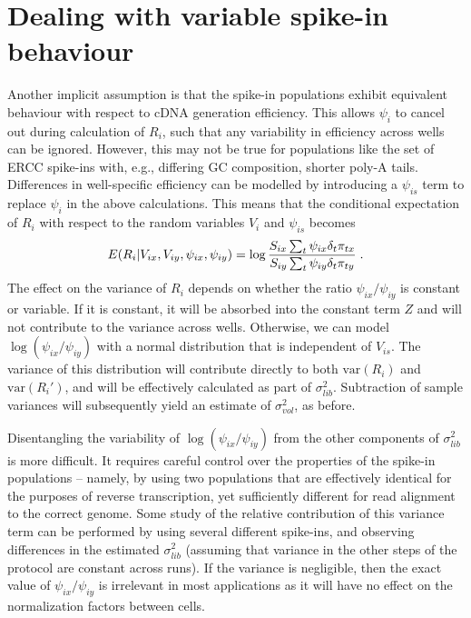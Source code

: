 \documentclass{article}
\begin{document}
\newpage
\section{Dealing with variable spike-in behaviour}
Another implicit assumption is that the spike-in populations exhibit equivalent behaviour with respect to cDNA generation efficiency.
This allows $\psi_i$ to cancel out during calculation of $R_i$, such that any variability in efficiency across wells can be ignored.
However, this may not be true for populations like the set of ERCC spike-ins with, e.g., differing GC composition, shorter poly-A tails.
Differences in well-specific efficiency can be modelled by introducing a $\psi_{is}$ term to replace $\psi_i$ in the above calculations.
This means that the conditional expectation of $R_i$ with respect to the random variables $V_{i}$ and $\psi_{is}$ becomes
\[
E(R_i | V_{ix}, V_{iy},  \psi_{ix}, \psi_{iy} ) = \log \frac{ S_{ix} \sum_t \psi_{ix}\delta_{t} \pi_{tx} } { S_{iy}\sum_t \psi_{iy}\delta_{t} \pi_{ty} } \;. \\
\]
The effect on the variance of $R_i$ depends on whether the ratio $\psi_{ix}/\psi_{iy}$ is constant or variable.
If it is constant, it will be absorbed into the constant term $Z$ and will not contribute to the variance across wells.
Otherwise, we can model $\log(\psi_{ix}/\psi_{iy})$ with a normal distribution that is independent of $V_{is}$.
The variance of this distribution will contribute directly to both $\mbox{var}(R_i)$ and $\mbox{var}(R_i')$, and will be effectively calculated as part of $\sigma^2_{lib}$.
Subtraction of sample variances will subsequently yield an estimate of $\sigma^2_{vol}$, as before.

Disentangling the variability of $\log(\psi_{ix}/\psi_{iy})$ from the other components of $\sigma^2_{lib}$ is more difficult.
It requires careful control over the properties of the spike-in populations -- namely, by using two populations that are effectively identical for the purposes of reverse transcription, yet sufficiently different for read alignment to the correct genome.
Some study of the relative contribution of this variance term can be performed by using several different spike-ins, and observing differences in the estimated $\sigma^2_{lib}$ (assuming that variance in the other steps of the protocol are constant across runs).
If the variance is negligible, then the exact value of $\psi_{ix}/\psi_{iy}$ is irrelevant in most applications as it will have no effect on the normalization factors between cells.
\end{document}
